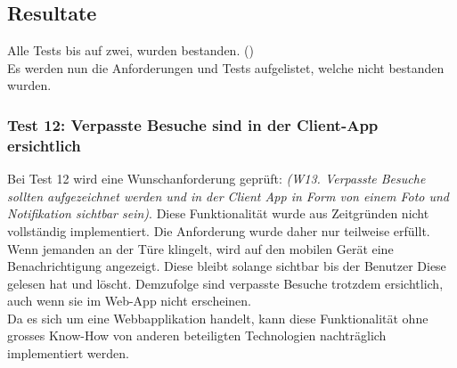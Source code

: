 \subsection{Resultate}
Alle Tests bis auf zwei, wurden bestanden. ()
\\
Es werden nun die Anforderungen und Tests aufgelistet, welche nicht bestanden wurden.
\subsubsection{Test 12: Verpasste Besuche sind in der Client-App ersichtlich}
Bei Test 12 wird eine Wunschanforderung geprüft: \textit{(W13. Verpasste Besuche sollten aufgezeichnet werden und in der Client App in Form von einem Foto und Notifikation sichtbar sein)}. Diese Funktionalität wurde aus Zeitgründen nicht vollständig implementiert. Die Anforderung wurde daher nur teilweise erfüllt. Wenn jemanden an der Türe klingelt, wird auf den mobilen Gerät eine Benachrichtigung angezeigt. Diese bleibt solange sichtbar bis der Benutzer Diese gelesen hat und löscht. Demzufolge sind verpasste Besuche trotzdem ersichtlich, auch wenn sie im Web-App nicht erscheinen.
\\
Da es sich um eine Webbapplikation handelt, kann diese Funktionalität ohne grosses Know-How von anderen beteiligten Technologien nachträglich implementiert werden.

